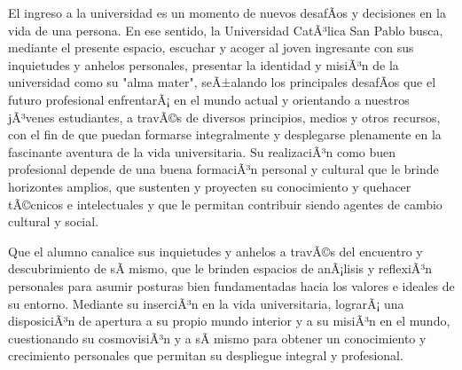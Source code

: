 \begin{syllabus}


\begin{justification}
El ingreso a la universidad es un momento de nuevos desafÃ­os y decisiones en la vida de una persona. En ese sentido, la Universidad CatÃ³lica San Pablo busca, mediante el presente espacio, escuchar y acoger al joven ingresante con sus inquietudes y anhelos personales, presentar la identidad y misiÃ³n de la universidad como su "alma mater", seÃ±alando los principales desafÃ­os que el futuro profesional enfrentarÃ¡ en el mundo actual  y orientando a nuestros jÃ³venes estudiantes, a travÃ©s de diversos principios, medios y otros recursos, con el fin de que puedan formarse integralmente y desplegarse plenamente en la fascinante aventura de la vida universitaria.  Su realizaciÃ³n como buen profesional depende de una buena formaciÃ³n personal y cultural que le brinde horizontes amplios, que sustenten y proyecten su conocimiento y quehacer tÃ©cnicos e intelectuales y que le permitan contribuir siendo agentes de cambio cultural y social.
\end{justification}

\begin{goals}
\item Que el alumno canalice sus inquietudes y anhelos a travÃ©s del encuentro y descubrimiento de sÃ­ mismo, que le brinden espacios de anÃ¡lisis y reflexiÃ³n personales para asumir posturas bien fundamentadas hacia los valores e ideales de su entorno. Mediante su inserciÃ³n en la vida universitaria, lograrÃ¡ una disposiciÃ³n de apertura a su propio mundo interior y a su misiÃ³n en el mundo, cuestionando su cosmovisiÃ³n y a sÃ­ mismo para obtener un conocimiento y crecimiento personales que permitan su despliegue integral y profesional. 
\end{goals}

\begin{outcomes}
\end{outcomes}


\end{syllabus}
